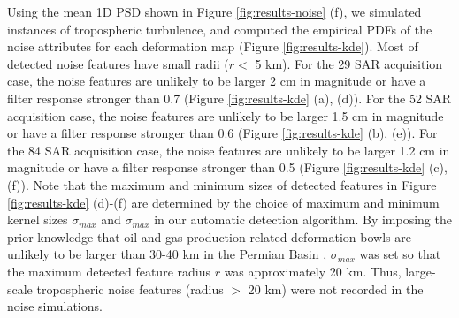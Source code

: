 Using the mean 1D PSD shown in Figure \ref{fig:results-noise} (f), we simulated instances of tropospheric turbulence, and computed the empirical PDFs of the noise attributes for each deformation map (Figure \ref{fig:results-kde}).  Most of detected noise features have small radii ($r <$ 5 km). For the 29 SAR acquisition case, the noise features are unlikely to be larger 2 cm in magnitude or have a filter response stronger than 0.7 (Figure \ref{fig:results-kde} (a), (d)). For the 52 SAR acquisition case, the noise features are unlikely to be larger 1.5 cm in magnitude or have a filter response stronger than 0.6 (Figure \ref{fig:results-kde} (b), (e)). For the 84 SAR acquisition case, the noise features are unlikely to be larger 1.2 cm in magnitude or have a filter response stronger than 0.5 (Figure \ref{fig:results-kde} (c), (f)).
Note that the maximum and minimum sizes of detected features in Figure \ref{fig:results-kde} (d)-(f) are determined by the choice of maximum and minimum kernel sizes $\sigma_{max}$ and $\sigma_{max}$ in our automatic detection algorithm. By imposing the prior knowledge that oil and gas-production related deformation bowls are unlikely to be larger than 30-40 km in the Permian Basin \citep{Staniewicz2020InsarRevealsComplex}, $\sigma_{max}$ was set so that the maximum detected feature radius $r$ was approximately 20 km. Thus, large-scale tropospheric noise features (radius $>$ 20 km) were not recorded in the noise simulations.



